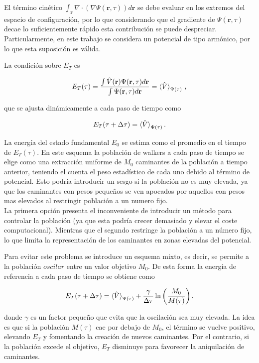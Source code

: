 \documentclass[11pt,a4paper,twoside,pdf]{article}
\numberwithin{equation}{section}
\begin{document}
El término cinético $ \int_{\mathbf{r}} \nabla \cdot ( \nabla \Psi(\mathbf{r}, \tau) ) d\mathbf{r}$ se debe evaluar en los extremos del espacio de configuración, por lo que considerando que el gradiente de $\Psi(\mathbf{r}, \tau)$ decae lo suficientemente rápido esta contribución se puede despreciar. Particularmente, en este trabajo se considera un potencial de tipo armónico, por lo que esta suposición es válida.

La condición sobre $E_T$ es

$$
    E_T (\tau)= \frac{\int \hat{V} (\mathbf{r}) \Psi(\mathbf{r},  \tau) d\mathbf{r}}{\int  \Psi(\mathbf{r},  \tau) d\mathbf{r}} = \braket{\hat{V}}_{\Psi (\tau)} \, ,
$$

que se ajusta dinámicamente a cada paso de tiempo como

$$
    E_T (\tau + \Delta \tau)=  \braket{\hat{V}}_{\Psi (\tau)}.
$$

La energía del estado fundamental $E_0$ se estima como el promedio en el tiempo de $E_T(\tau)$. En este esquema la población de walkers a cada paso de tiempo se elige como una extracción uniforme de $M_0$ caminantes de la población a tiempo anterior, teniendo el cuenta el peso estadístico de cada uno debido al término de potencial. Esto podría introducir un sesgo si la población no es muy elevada, ya que los caminantes con pesos pequeños se ven apocados por aquellos con pesos mas elevados al restringir población a un numero fijo.\\

La primera opción presenta el inconveniente de introducir un método para controlar la población (ya que esta podría crecer demasiado y elevar el coste computacional). Mientras que el segundo restringe la población a un número fijo, lo que limita la representación de los caminantes en zonas elevadas del potencial.

Para evitar este problema se introduce un esquema mixto, es decir, se permite a la población $oscilar$ entre un valor objetivo $M_0$. De esta forma la energía de referencia a cada paso de tiempo se obtiene como

$$E_T(\tau + \Delta \tau) = \braket{\hat{V}}_{\Psi(\tau)} + \frac{\gamma}{\Delta \tau} \ln \left( \frac{M_0}{M(\tau)} \right),$$


donde $\gamma$ es un factor pequeño que evita que la oscilación sea muy elevada. La idea es que si la población $M(\tau)$ cae por debajo de $M_0$, el término se vuelve positivo, elevando $E_T$ y fomentando la creación de nuevos caminantes. Por el contrario, si la población excede el objetivo, $E_T$ disminuye para favorecer la aniquilación de caminantes.
\end{document}
